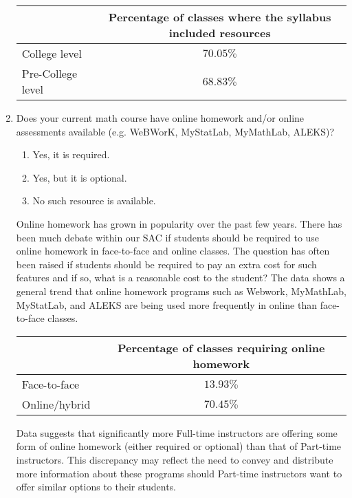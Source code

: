 \begin{enumerate}
	\begin{tabular}{lc}
		\toprule
		                  & Percentage of classes where the syllabus included resources \\
		\midrule
		College level     & $70.05\%$                                                   \\
		Pre-College level & $68.83\%$                                                   \\
		\bottomrule
	\end{tabular}
	\item Does your current math course have online homework and/or online assessments available (e.g. WeBWorK, MyStatLab, MyMathLab, ALEKS)?
	\begin{enumerate}
		\item Yes, it is required.
		\item Yes, but it is optional.
		\item No such resource is available.
	\end{enumerate}
	Online homework has grown in popularity over the past few years. There has been much debate within our SAC if students should be required to use online homework in face-to-face and online classes. The question has often been raised if students should be required to pay an extra cost for such features and if so, what is a reasonable cost to the student? The data shows a general trend that online homework programs such as Webwork,  MyMathLab, MyStatLab, and ALEKS are being used more frequently in online than face-to-face classes. 
	
	\begin{tabular}{lc}
		\toprule
		              & Percentage of classes requiring online homework \\
		\midrule
		Face-to-face  & $13.93\%$                                       \\
		Online/hybrid & $70.45\%$                                       \\
		\bottomrule
	\end{tabular}
	
	Data suggests that significantly more Full-time instructors are offering some form of online homework (either required or optional) than that of Part-time instructors. This discrepancy may reflect the need to convey and distribute more information about these programs should Part-time instructors want to offer similar options to their students.
	

\end{enumerate}
